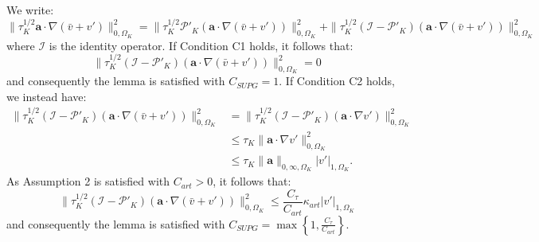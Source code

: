 \documentclass[11pt]{article}
\newenvironment{proof}[1][Proof]{\begin{trivlist}
\item[\hskip \labelsep {\bfseries #1}]}{\end{trivlist}}
\newcommand{\qed}{\nobreak \ifvmode \relax \else
      \ifdim\lastskip<1.5em \hskip-\lastskip
      \hskip1.5em plus0em minus0.5em \fi \nobreak
      \vrule height0.75em width0.5em depth0.25em\fi}
\begin{document}
\begin{proof}
We write:
\begin{equation}
\| \tau_K^{1/2} \bm{a} \cdot \nabla \left(\bar{v} + v'\right) \|^2_{0,\Omega_K} = \| \tau_K^{1/2} \mathcal{P}'_K \left( \bm{a} \cdot \nabla \left(\bar{v} + v'\right) \right) \|^2_{0,\Omega_K} + \| \tau_K^{1/2} \left( \mathcal{I} - \mathcal{P}'_K \right) \left( \bm{a} \cdot \nabla \left(\bar{v} + v'\right) \right) \|^2_{0,\Omega_K} \nonumber
\end{equation}
where $\mathcal{I}$ is the identity operator.  If Condition C1 holds, it follows that:
\begin{equation}
\| \tau_K^{1/2} \left( \mathcal{I} - \mathcal{P}'_K \right) \left( \bm{a} \cdot \nabla \left(\bar{v} + v'\right) \right) \|^2_{0,\Omega_K} = 0 \nonumber
\end{equation}
and consequently the lemma is satisfied with $C_{SUPG} = 1$.  If Condition C2 holds, we instead have:
\begin{align}
\| \tau_K^{1/2} \left( \mathcal{I} - \mathcal{P}'_K \right) \left( \bm{a} \cdot \nabla \left(\bar{v} + v'\right) \right) \|^2_{0,\Omega_K} &= \| \tau_K^{1/2} \left( \mathcal{I} - \mathcal{P}'_K \right) \left( \bm{a} \cdot \nabla v' \right) \|^2_{0,\Omega_K} \nonumber \\
&\leq \tau_K \| \bm{a} \cdot \nabla v' \|^2_{0,\Omega_K} \nonumber \\
&\leq \tau_K \| \bm{a} \|_{0,\infty,\Omega_K} | v' |_{1,\Omega_K}. \nonumber
\end{align}
As Assumption 2 is satisfied with $C_{art} > 0$, it follows that:
\begin{equation}
\| \tau_K^{1/2} \left( \mathcal{I} - \mathcal{P}'_K \right) \left( \bm{a} \cdot \nabla \left(\bar{v} + v'\right) \right) \|^2_{0,\Omega_K} \leq \frac{C_{\tau}}{C_{art}} \kappa_{art} | v' |_{1,\Omega_K} \nonumber
\end{equation}
and consequently the lemma is satisfied with $C_{SUPG} = \max\left\{1,\frac{C_{\tau}}{C_{art}}\right\}$.
\qed
\end{proof}
\end{document}

